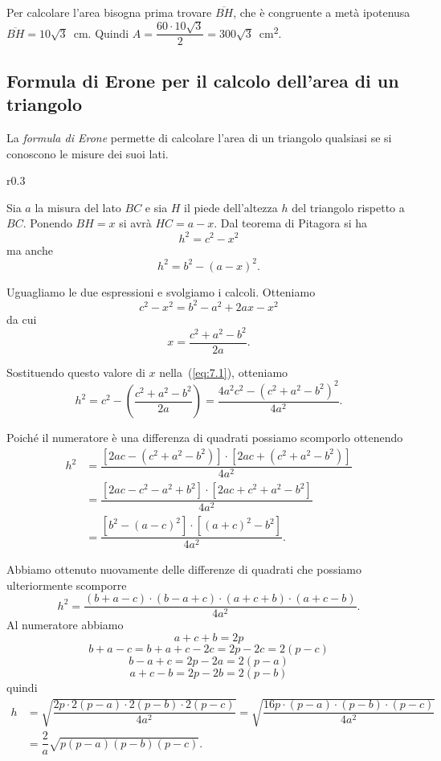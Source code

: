 \begin{exrig}
\begin{esempio}
Per calcolare l'area bisogna prima trovare \(\overline{BH}\), che è 
congruente a metà ipotenusa \(\overline{BH}=10\sqrt{3}\)~cm. Quindi 
\(A=\dfrac{60\cdot 10\sqrt{3}}{2}=300\sqrt{3}\)~cm\textsuperscript{2}.
\end{esempio}
\end{exrig}

\subsection{Formula di Erone per il calcolo dell'area di un triangolo}

La \emph{formula di Erone} permette di calcolare l'area di un 
triangolo qualsiasi se si conoscono le misure dei suoi lati.

\begin{wrapfigure}{r}{0.3\textwidth}
	\centering
	\vspace{10pt}
\end{wrapfigure}
Sia \(a\) la misura del lato \(BC\) e sia \(H\) il piede dell'altezza \(h\) 
del triangolo rispetto a \(BC\). Ponendo \(BH = x\) si avrà \(HC = a - x\).
Dal teorema di Pitagora si ha
\begin{equation}\label{eq:7.1}
h^2=c^2-x^2
\end{equation}
ma anche
\[h^2=b^2-(a-x)^2.\]

Uguagliamo le due espressioni e svolgiamo i calcoli. Otteniamo
\[c^2-x^2=b^2-a^2+2ax-x^2\]
da cui
\[x=\dfrac{c^2+a^2-b^2}{2a}.\]

Sostituendo questo valore di \(x\) nella~(\ref{eq:7.1}), otteniamo
\[h^2=c^2-\left(\dfrac{c^2+a^2-b^2}{2a}\right)=\dfrac{
4a^2c^2-\left(c^2+a^2-b^2\right)^2}{4a^2}.\]

Poiché il numeratore è una differenza di quadrati possiamo scomporlo 
ottenendo
\begin{align*}
h^2&=\dfrac{\left[2ac-\left(c^2+a^2-b^2\right)\right]\cdot\left[
2ac+\left(c^2+a^2-b^2\right)\right]}{4a^2}\\
&=\dfrac{\left[2ac-c^2-a^2+b^2\right]\cdot\left[2ac+c^2+a^2-b^2\right]
}{4a^2}\\
&=\dfrac{\left[b^2-(a-c)^2\right]\cdot\left[(a+c)^2-b^2\right]}{4a^2}.
\end{align*}

Abbiamo ottenuto nuovamente delle differenze di quadrati che possiamo 
ulteriormente scomporre
\[h^2=\dfrac{(b+a-c)\cdot(b-a+c)\cdot(a+c+b)\cdot(a+c-b)}{4a^2}.\]
Al numeratore abbiamo
\[a + c + b = 2p\]
\[b + a - c = b+a+c-2c = 2p-2c = 2(p-c)\]
\[b - a + c = 2p - 2a = 2 (p - a)\]
\[a + c - b = 2p - 2b = 2(p - b)\]
quindi
\begin{align*}
h&=\sqrt{\dfrac{2p\cdot 2(p-a) \cdot 2(p-b) \cdot 
2(p-c)}{4a^2}}=\sqrt{\dfrac{16p\cdot (p-a) \cdot (p-b) \cdot 
(p-c)}{4a^2}}\\
&=\dfrac{2}{a}\sqrt{p(p-a)(p-b)(p-c)}.
\end{align*}

